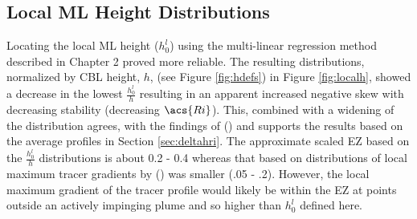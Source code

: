 \subsection{Local \acs{ML} Height Distributions}

Locating the local \acs{ML} height ($h^{l}_{0}$) using the multi-linear regression method described in Chapter 2 proved more reliable.  The resulting distributions, normalized by \acs{CBL} height, $h$, (see Figure \ref{fig:hdefs}) in Figure \ref{fig:localh},  showed a decrease in the lowest $\frac{h^{l}_{0}}{h}$ resulting in an apparent increased negative skew with decreasing stability (decreasing $\acs{Ri}$). This, combined with a widening of the distribution agrees, with the findings of \citeauthor{SullMoengStev} (\citeyear{SullMoengStev}) and supports the results based on the average profiles in Section \ref{sec:deltahri}.  The approximate scaled \acs{EZ} based on the $\frac{h^{l}_{0}}{h}$ distributions is about 0.2 - 0.4 whereas that based on distributions of local maximum tracer gradients by  \citeauthor{BrooksFowler2} (\citeyear{BrooksFowler2}) was smaller (.05 - .2).  However, the local maximum gradient of the tracer profile would likely be within the \acs{EZ} at points outside an actively impinging plume and so higher than $h^{l}_{0}$ defined here. \\  


